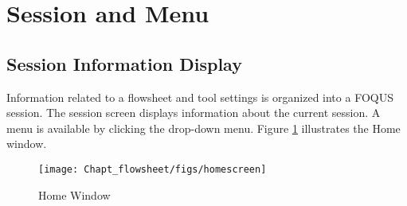 \section{Session and Menu}

\subsection{Session Information Display}
Information related to a flowsheet and tool settings is organized into a FOQUS session. The session screen displays information about the current session. A menu is available by clicking the  drop-down menu. Figure \ref{fig.homescreen} illustrates the Home window.
\begin{figure}[H]
	\begin{center}
		\texttt{[image: Chapt\_flowsheet/figs/homescreen]}
		\caption{Home Window}
		\label{fig.homescreen}
	\end{center}
\end{figure}
